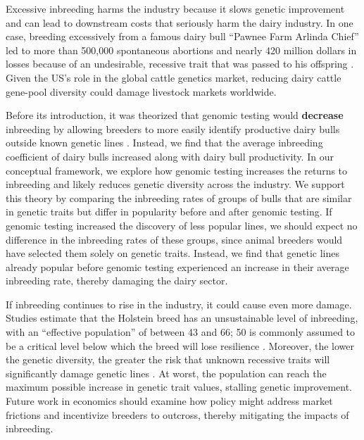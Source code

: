 \documentclass[12pt,letterpaper]{article}
\begin{document}

Excessive inbreeding harms the industry because it slows genetic improvement and can lead to downstream costs that seriously harm the dairy industry. In one case, breeding excessively from a famous dairy bull ``Pawnee Farm Arlinda Chief'' led to more than 500,000 spontaneous abortions and nearly 420 million dollars in losses because of an undesirable, recessive trait that was passed to his offspring \citep{Adams2016}. Given the US's role in the global cattle genetics market, reducing dairy cattle gene-pool diversity could damage livestock markets worldwide.

Before its introduction, it was theorized that genomic testing would \textbf{decrease} inbreeding by allowing breeders to more easily identify productive dairy bulls outside known genetic lines \citep{Daetwyler2007}. Instead, we find that the average inbreeding coefficient of dairy bulls increased along with dairy bull productivity. In our conceptual framework, we explore how genomic testing increases the returns to inbreeding and likely reduces genetic diversity across the industry. We support this theory by comparing the inbreeding rates of groups of bulls that are similar in genetic traits but differ in popularity before and after genomic testing. If genomic testing increased the discovery of less popular lines, we should expect no difference in the inbreeding rates of these groups, since animal breeders would have selected them solely on genetic traits. Instead, we find that genetic lines already popular before genomic testing experienced an increase in their average inbreeding rate, thereby damaging the dairy sector.

If inbreeding continues to rise in the industry, it could cause even more damage. Studies estimate that the Holstein breed has an unsustainable level of inbreeding, with an ``effective population'' of between 43 and 66; 50 is commonly assumed to be a critical level below which the breed will lose resilience \citep{Makanjuola2020}. Moreover, the lower the genetic diversity, the greater the risk that unknown recessive traits will significantly damage genetic lines \citep{Cole2011, Lozada2024}. At worst, the population can reach the maximum possible increase in genetic trait values, stalling genetic improvement. Future work in economics should examine how policy might address market frictions and incentivize breeders to outcross, thereby mitigating the impacts of inbreeding.
\end{document}
